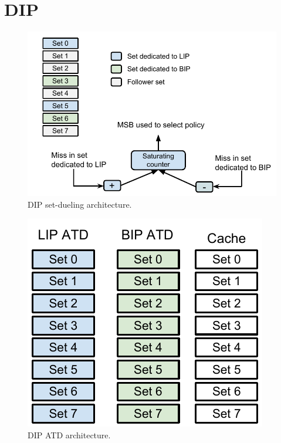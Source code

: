 \section{DIP}
\label{sec:algorithms:dip}

\begin{figure}
    \centering
    \includegraphics[width=\textwidth]{figures/algorithms/DIP_architecture}
    \caption{DIP set-dueling architecture.}
    \label{fig:algorithms:dip:set_dueling}
\end{figure}

\begin{figure}
    \centering
    \includegraphics[width=\textwidth]{figures/algorithms/DIP_atd_architecture}
    \caption{DIP ATD architecture.}
    \label{fig:algorithms:dip:atd}
\end{figure}

